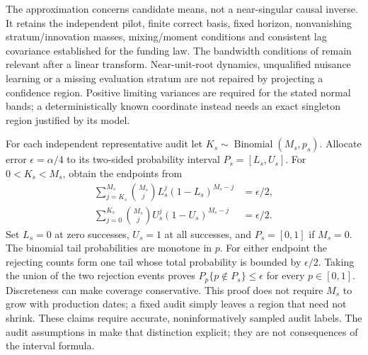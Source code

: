 The approximation concerns candidate means, not a near-singular causal
inverse. It retains the independent pilot, finite correct basis, fixed
horizon, nonvanishing stratum/innovation masses, mixing/moment conditions
and consistent lag covariance established for the funding law. The
bandwidth conditions of \citet[Theorem 2]{newey1986} remain relevant after a
linear transform. Near-unit-root dynamics, unqualified nuisance learning or
a missing evaluation stratum are not repaired by projecting a confidence
region. Positive limiting variances are required for the stated normal
bands; a deterministically known coordinate instead needs an exact
singleton region justified by its model.

For each independent representative audit let
$K_s\sim\operatorname{Binomial}(M_s,p_s)$. Allocate error
$\epsilon=\alpha/4$ to its two-sided probability interval $P_s=[L_s,U_s]$.
For $0<K_s<M_s$, obtain the endpoints from
\begin{equation}
 \begin{split}
 \sum_{j=K_s}^{M_s}\binom{M_s}{j}L_s^j(1-L_s)^{M_s-j}&=\epsilon/2,\\
 \sum_{j=0}^{K_s}\binom{M_s}{j}U_s^j(1-U_s)^{M_s-j}&=\epsilon/2.
 \end{split}
 \label{s61:binomial-inversion}
\end{equation}
Set $L_s=0$ at zero successes, $U_s=1$ at all successes, and
$P_s=[0,1]$ if $M_s=0$. The binomial tail probabilities are monotone
in $p$. For either endpoint the rejecting counts form one tail whose
total probability is bounded by $\epsilon/2$. Taking the union of the
two rejection events proves
$P_p\{p\notin P_s\}\le\epsilon$ for every $p\in[0,1]$.
Discreteness can make coverage conservative. This proof does not require
$M_s$ to grow with production dates; a fixed audit simply leaves a region
that need not shrink. These claims require accurate, noninformatively
sampled audit labels. The audit assumptions in
\citet[Section 2.1, Audit Sample]{slawski2025} make that distinction explicit;
they are not consequences of the interval formula.

